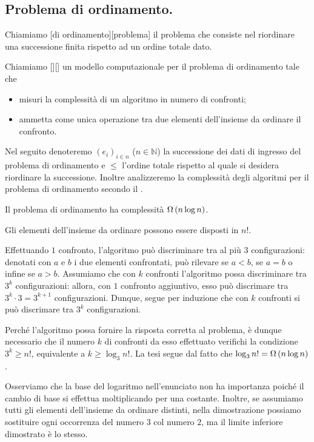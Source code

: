 \subsection{Problema di ordinamento.}
\label{AlgoritmiEStruttureDiDati_ProblemaDiOrdinamento}
\begin{Definition}
	Chiamiamo [di ordinamento][problema] il problema che consiste nel riordinare una successione finita rispetto ad un ordine totale dato.
\end{Definition}
\begin{Definition}
	Chiamiamo [][] un modello computazionale per il problema di ordinamento tale che
	\begin{itemize}
		\item misuri la complessit\`a di un algoritmo in numero di confronti;
		\item ammetta come unica operazione tra due elementi dell'insieme da ordinare il confronto.
	\end{itemize}
\end{Definition}
\par Nel seguito denoteremo $(e_i)_{i \in n}$ ($n \in \mathbb{N}$) la
successione dei dati di ingresso del problema di ordinamento e $\leq$ l'ordine
totale rispetto al quale si desidera riordinare la successione. Inoltre
analizzeremo la complessit\`a degli algoritmi per il problema di ordinamento
secondo il .
\begin{Theorem}
	Il problema di ordinamento ha complessit\`a $\Omega \left ( n \log n \right )$.
\end{Theorem}
\Proof Gli elementi dell'insieme da ordinare possono essere disposti in $n!$.
\par Effettuando $1$ confronto, l'algoritmo pu\`o discriminare tra al pi\`u $3$
configurazioni: denotati con $a$ e $b$ i due elementi confrontati, pu\`o
rilevare se $a < b$, se $a = b$ o infine se $a > b$. Assumiamo che con $k$
confronti l'algoritmo possa discriminare tra $3^k$ configurazioni: allora, con
$1$ confronto aggiuntivo, esso pu\`o discrimare tra $3^k \cdot 3 = 3^{k + 1}$
configurazioni. Dunque, segue per induzione che con $k$ confronti si pu\`o
discrimare tra $3^k$ configurazioni.
\par Perch\'e l'algoritmo possa fornire la risposta corretta al problema, \`e
dunque necessario che il numero $k$ di confronti da esso effettuato verifichi la
condizione $3^k \geq n!$, equivalente a $k \geq \log_3 n!$. La tesi segue dal
fatto che $\log_3 n! = \Omega \left ( n \log n \right )$.
\par Osserviamo che la base del logaritmo nell'enunciato non ha importanza
poich\'e il cambio di base si effettua moltiplicando per una costante. Inoltre,
se assumiamo tutti gli elementi dell'insieme da ordinare distinti, nella
dimostrazione possiamo sostituire ogni occorrenza del numero $3$ col numero $2$,
ma il limite inferiore dimostrato \`e lo stesso. \EndProof






